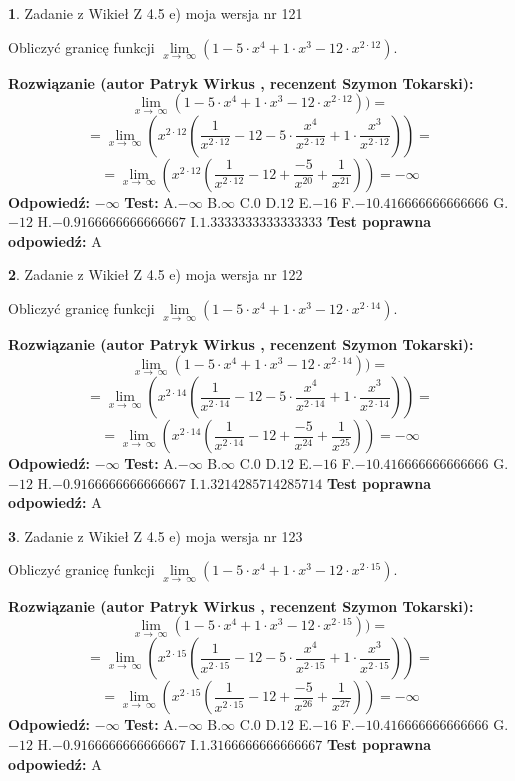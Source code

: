 \documentclass[12pt, a4paper]{article}
\theoremstyle{definition} %
\newtheorem{zad}{}
\newcommand{\zadStart}[1]{\begin{zad}#1\newline}
\newcommand{\zadStop}{\end{zad}}
\newcommand{\rozwStart}[2]{\noindent \textbf{Rozwiązanie (autor #1 , recenzent #2): }\newline}
\newcommand{\rozwStop}{\newline}
\newcommand{\odpStart}{\noindent \textbf{Odpowiedź:}\newline}
\newcommand{\odpStop}{\newline}
\newcommand{\testStart}{\noindent \textbf{Test:}\newline}
\newcommand{\testStop}{\newline}
\newcommand{\kluczStart}{\noindent \textbf{Test poprawna odpowiedź:}\newline}
\newcommand{\kluczStop}{\newline}
\begin{document}
\zadStart{Zadanie z Wikieł Z 4.5 e) moja wersja nr 121}


Obliczyć granicę funkcji  $\lim\limits_{x\to\ \infty}(1 - 5 \cdot x^{4}+1 \cdot x^{3}- 12 \cdot x^{2\cdot12})$.
\zadStop
\rozwStart{Patryk Wirkus}{Szymon Tokarski}
$$\lim\limits_{x\to\ \infty}(1 - 5 \cdot x^{4}+1 \cdot x^{3}- 12 \cdot x^{2\cdot12}))=$$
$$=\lim\limits_{x\to\ \infty}(x^{2\cdot12}(\frac{1}{x^{2\cdot12}}-12 -5 \cdot \frac{x^{4}}{x^{2\cdot12}}+1 \cdot \frac{x^{3}}{x^{2\cdot12}}))=$$
$$=\lim\limits_{x\to\ \infty}(x^{2\cdot12}(\frac{1}{x^{2\cdot12}}-12 + \frac{-5}{x^{20}}+ \frac{1}{x^{21}}))=-\infty$$
\rozwStop
\odpStart
$-\infty$
\odpStop
\testStart
A.$-\infty$ B.$\infty$ C.$0$ D.$12$ E.$-16$
F.$-10.416666666666666$ G.$-12$
H.$-0.9166666666666667$
I.$1.3333333333333333$
\testStop
\kluczStart
A
\kluczStop



\zadStart{Zadanie z Wikieł Z 4.5 e) moja wersja nr 122}


Obliczyć granicę funkcji  $\lim\limits_{x\to\ \infty}(1 - 5 \cdot x^{4}+1 \cdot x^{3}- 12 \cdot x^{2\cdot14})$.
\zadStop
\rozwStart{Patryk Wirkus}{Szymon Tokarski}
$$\lim\limits_{x\to\ \infty}(1 - 5 \cdot x^{4}+1 \cdot x^{3}- 12 \cdot x^{2\cdot14}))=$$
$$=\lim\limits_{x\to\ \infty}(x^{2\cdot14}(\frac{1}{x^{2\cdot14}}-12 -5 \cdot \frac{x^{4}}{x^{2\cdot14}}+1 \cdot \frac{x^{3}}{x^{2\cdot14}}))=$$
$$=\lim\limits_{x\to\ \infty}(x^{2\cdot14}(\frac{1}{x^{2\cdot14}}-12 + \frac{-5}{x^{24}}+ \frac{1}{x^{25}}))=-\infty$$
\rozwStop
\odpStart
$-\infty$
\odpStop
\testStart
A.$-\infty$ B.$\infty$ C.$0$ D.$12$ E.$-16$
F.$-10.416666666666666$ G.$-12$
H.$-0.9166666666666667$
I.$1.3214285714285714$
\testStop
\kluczStart
A
\kluczStop



\zadStart{Zadanie z Wikieł Z 4.5 e) moja wersja nr 123}


Obliczyć granicę funkcji  $\lim\limits_{x\to\ \infty}(1 - 5 \cdot x^{4}+1 \cdot x^{3}- 12 \cdot x^{2\cdot15})$.
\zadStop
\rozwStart{Patryk Wirkus}{Szymon Tokarski}
$$\lim\limits_{x\to\ \infty}(1 - 5 \cdot x^{4}+1 \cdot x^{3}- 12 \cdot x^{2\cdot15}))=$$
$$=\lim\limits_{x\to\ \infty}(x^{2\cdot15}(\frac{1}{x^{2\cdot15}}-12 -5 \cdot \frac{x^{4}}{x^{2\cdot15}}+1 \cdot \frac{x^{3}}{x^{2\cdot15}}))=$$
$$=\lim\limits_{x\to\ \infty}(x^{2\cdot15}(\frac{1}{x^{2\cdot15}}-12 + \frac{-5}{x^{26}}+ \frac{1}{x^{27}}))=-\infty$$
\rozwStop
\odpStart
$-\infty$
\odpStop
\testStart
A.$-\infty$ B.$\infty$ C.$0$ D.$12$ E.$-16$
F.$-10.416666666666666$ G.$-12$
H.$-0.9166666666666667$
I.$1.3166666666666667$
\testStop
\kluczStart
A
\kluczStop
\end{document}
